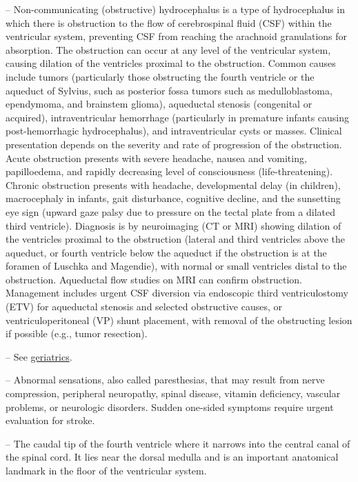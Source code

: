 -- Non-communicating (obstructive) hydrocephalus is a type of hydrocephalus in which there is obstruction to the flow of cerebrospinal fluid (CSF) within the ventricular system, preventing CSF from reaching the arachnoid granulations for absorption. The obstruction can occur at any level of the ventricular system, causing dilation of the ventricles proximal to the obstruction. Common causes include tumors (particularly those obstructing the fourth ventricle or the aqueduct of Sylvius, such as posterior fossa tumors such as medulloblastoma, ependymoma, and brainstem glioma), aqueductal stenosis (congenital or acquired), intraventricular hemorrhage (particularly in premature infants causing post-hemorrhagic hydrocephalus), and intraventricular cysts or masses. Clinical presentation depends on the severity and rate of progression of the obstruction. Acute obstruction presents with severe headache, nausea and vomiting, papilloedema, and rapidly decreasing level of consciousness (life-threatening). Chronic obstruction presents with headache, developmental delay (in children), macrocephaly in infants, gait disturbance, cognitive decline, and the sunsetting eye sign (upward gaze palsy due to pressure on the tectal plate from a dilated third ventricle). Diagnosis is by neuroimaging (CT or MRI) showing dilation of the ventricles proximal to the obstruction (lateral and third ventricles above the aqueduct, or fourth ventricle below the aqueduct if the obstruction is at the foramen of Luschka and Magendie), with normal or small ventricles distal to the obstruction. Aqueductal flow studies on MRI can confirm obstruction. Management includes urgent CSF diversion via endoscopic third ventriculostomy (ETV) for aqueductal stenosis and selected obstructive causes, or ventriculoperitoneal (VP) shunt placement, with removal of the obstructing lesion if possible (e.g., tumor resection).

-- See \hyperlink{Geriatrics}{geriatrics}.

-- Abnormal sensations, also called paresthesias, that may result from nerve compression, peripheral neuropathy, spinal disease, vitamin deficiency, vascular problems, or neurologic disorders. Sudden one-sided symptoms require urgent evaluation for stroke.

-- The caudal tip of the fourth ventricle where it narrows into the central canal of the spinal cord. It lies near the dorsal medulla and is an important anatomical landmark in the floor of the ventricular system.

